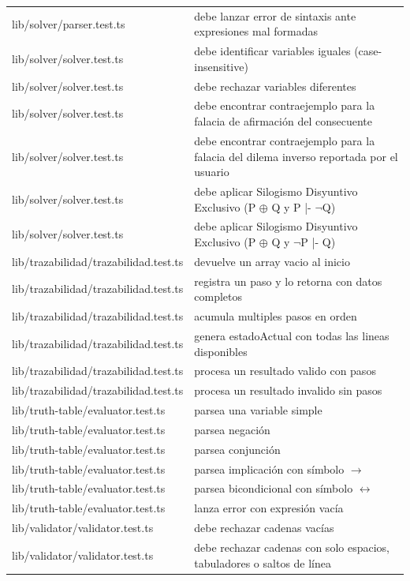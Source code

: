 \documentclass[11pt,a4paper,openany]{book}
\begin{document}
\begin{center}
\begin{longtable}{ll}
lib/solver/parser.test.ts & debe lanzar error de sintaxis ante expresiones mal formadas \\
lib/solver/solver.test.ts & debe identificar variables iguales (case-insensitive) \\
lib/solver/solver.test.ts & debe rechazar variables diferentes \\
lib/solver/solver.test.ts & debe encontrar contraejemplo para la falacia de afirmación del consecuente \\
lib/solver/solver.test.ts & debe encontrar contraejemplo para la falacia del dilema inverso reportada por el usuario \\
lib/solver/solver.test.ts & debe aplicar Silogismo Disyuntivo Exclusivo (P $ \oplus $ Q y P |- $ \lnot $Q) \\
lib/solver/solver.test.ts & debe aplicar Silogismo Disyuntivo Exclusivo (P $ \oplus $ Q y $ \lnot $P |- Q) \\
lib/trazabilidad/trazabilidad.test.ts & devuelve un array vacio al inicio \\
lib/trazabilidad/trazabilidad.test.ts & registra un paso y lo retorna con datos completos \\
lib/trazabilidad/trazabilidad.test.ts & acumula multiples pasos en orden \\
lib/trazabilidad/trazabilidad.test.ts & genera estadoActual con todas las lineas disponibles \\
lib/trazabilidad/trazabilidad.test.ts & procesa un resultado valido con pasos \\
lib/trazabilidad/trazabilidad.test.ts & procesa un resultado invalido sin pasos \\
lib/truth-table/evaluator.test.ts & parsea una variable simple \\
lib/truth-table/evaluator.test.ts & parsea negación \\
lib/truth-table/evaluator.test.ts & parsea conjunción \\
lib/truth-table/evaluator.test.ts & parsea implicación con símbolo $ \to $ \\
lib/truth-table/evaluator.test.ts & parsea bicondicional con símbolo $ \leftrightarrow $ \\
lib/truth-table/evaluator.test.ts & lanza error con expresión vacía \\
lib/validator/validator.test.ts & debe rechazar cadenas vacías \\
lib/validator/validator.test.ts & debe rechazar cadenas con solo espacios, tabuladores o saltos de línea \\

\end{longtable}
\end{center}
\end{document}
